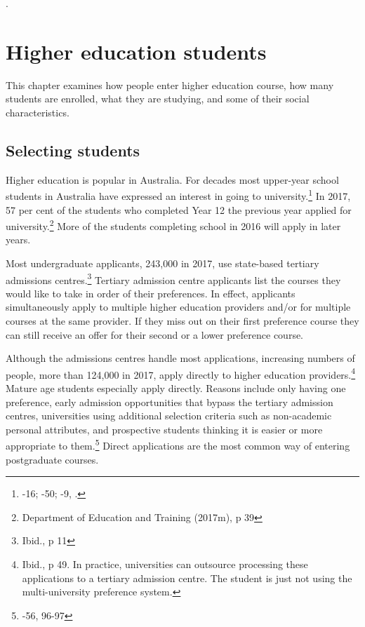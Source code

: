 \documentclass{grattan}
\begin{document}
.

%
\chapter{Higher education students }\label{chap:higher-education-students}

This chapter examines how people enter higher education course, how many students are enrolled, what they are studying, and some of their social characteristics.

%
\section{Selecting students}\label{sec:selecting-students}

Higher education is popular in Australia. For decades most upper-year school students in Australia have expressed an interest in going to university.\footnote{\textcites[][15]{James2002socioeconomicbackg}[][15]{MissionAustralia2016youthsurveyreport}-16; \textcite[][48]{RoyMorganResearch2009year12choicesa}-50; \textcite[][7]{ANOPDEET1994youngpeoplesatti}-9, \textcite[][10]{ACER2018pisaaustraliainf}.} In 2017, 57 per cent of the students who completed Year 12 the previous year applied for university.\footnote{Department of Education and Training (2017m), p 39} More of the students completing school in 2016 will apply in later years.

Most undergraduate applicants, 243,000 in 2017, use state-based tertiary admissions centres.\footnote{Ibid., p 11} Tertiary admission centre applicants list the courses they would like to take in order of their preferences. In effect, applicants simultaneously apply to multiple higher education providers and/or for multiple courses at the same provider. If they miss out on their first preference course they can still receive an offer for their second or a lower preference course.

Although the admissions centres handle most applications, increasing numbers of people, more than 124,000 in 2017, apply directly to higher education providers.\footnote{Ibid., p 49. In practice, universities can outsource processing these applications to a tertiary admission centre. The student is just not using the multi-university preference system.} Mature age students especially apply directly. Reasons include only having one preference, early admission opportunities that bypass the tertiary admission centres, universities using additional selection criteria such as non-academic personal attributes, and prospective students thinking it is easier or more appropriate to them.\footnote{\textcite[][55]{Harvey2016theadaptationoft}-56, 96-97} Direct applications are the most common way of entering postgraduate courses.
\end{document}
